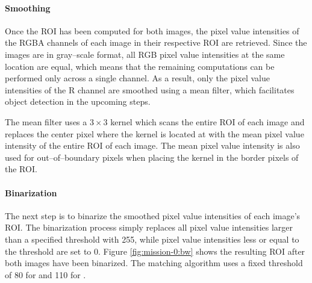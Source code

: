 \paragraph{Smoothing} \label{paragraph:case-study:impl:smooth}
Once the ROI has been computed for both images, the pixel value intensities of the RGBA channels of each image in their respective ROI are retrieved. Since the images are in gray--scale format, all RGB pixel value intensities at the same location are equal, which means that the remaining computations can be performed only across a single channel. As a result, only the pixel value intensities of the R channel are smoothed using a mean filter, which facilitates object detection in the upcoming steps.

The mean filter uses a $3 \times 3$ kernel which scans the entire ROI of each image and replaces the center pixel where the kernel is located at with the mean pixel value intensity of the entire ROI of each image. The mean pixel value intensity is also used for out--of--boundary pixels when placing the kernel in the border pixels of the ROI.

\paragraph{Binarization}
The next step is to binarize the smoothed pixel value intensities of each image's ROI. The binarization process simply replaces all pixel value intensities larger than a specified threshold with 255, while pixel value intensities less or equal to the threshold are set to 0. Figure \ref{fig:mission-0:bw} shows the resulting ROI after both images have been binarized. The matching algorithm uses a fixed threshold of 80 for \usno and 110 for \panstarrs.

